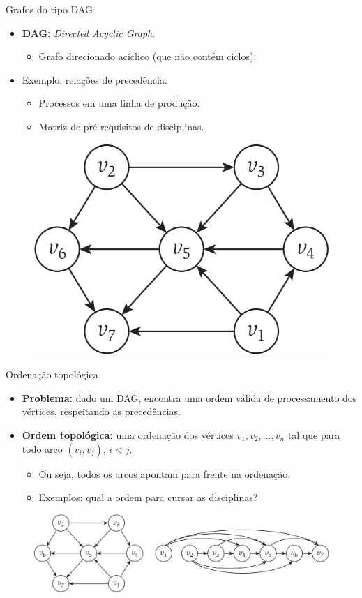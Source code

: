 \begin{frame}{Grafos do tipo DAG}
	
	\begin{itemize}
		\item \textbf{DAG:} \textit{Directed Acyclic Graph}.
		\begin{itemize}
			\item Grafo direcionado acíclico (que não contém ciclos).
		\end{itemize}
	
		\item Exemplo: relações de precedência.
		\begin{itemize}
			\item Processos em uma linha de produção.
			\item Matriz de pré-requisitos de disciplinas.
		\end{itemize}
	\end{itemize}


	\begin{figure}
		\centering
		\includegraphics[width=0.45\linewidth]{img/dag}
	\end{figure}
	
\end{frame}



\begin{frame}{Ordenação topológica}

	\begin{itemize}
		\item \textbf{Problema:} dado um DAG, encontra uma ordem válida de processamento dos vértices, respeitando as precedências.
		\item \textbf{Ordem topológica:} uma ordenação dos vértices $v_1, v_2, \dots, v_n$ tal que para todo arco $(v_i, v_j)$, $i < j$.
		\begin{itemize}
			\item Ou seja, todos os arcos apontam para frente na ordenação.
			\item Exemplos: qual a ordem para cursar as disciplinas?
		\end{itemize}
	\end{itemize}


	\begin{figure}
		\centering
		\includegraphics[width=0.9\linewidth]{img/ordenacao}
	\end{figure}
\end{frame}



